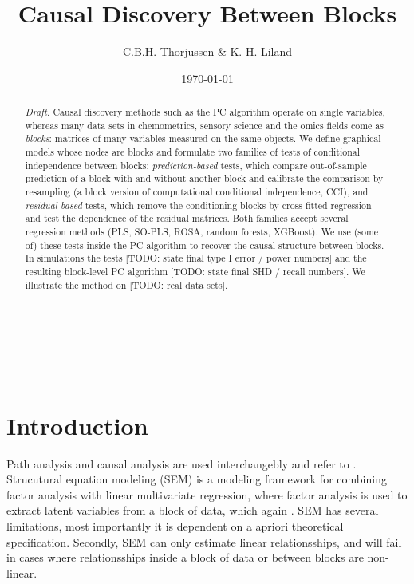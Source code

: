 \documentclass[10pt,leqno]{amsart}
\newcommand{\todo}[1]{{\color{red}[TODO: #1]}}
\begin{document}
\title{Causal Discovery Between Blocks} %
\author[Initial Surname]{C.B.H. Thorjussen \& K. H. Liland}
\date{\today}
\address{Telemarksforsking}
\maketitle

\let\thefootnote\relax
{} %

\begin{abstract}
\emph{Draft.} Causal discovery methods such as the PC algorithm operate on single
variables, whereas many data sets in chemometrics, sensory science and the
omics fields come as \emph{blocks}: matrices of many variables measured on the
same objects. We define graphical models whose nodes are blocks and formulate two
families of tests of conditional independence between blocks: \emph{prediction-based}
tests, which compare out-of-sample prediction of a block with and without another
block and calibrate the comparison by resampling (a block version of computational
conditional independence, CCI), and \emph{residual-based} tests, which remove the
conditioning blocks by cross-fitted regression and test the dependence of the
residual matrices. Both families accept several regression methods (PLS, SO-PLS,
ROSA, random forests, XGBoost). We use (some of) these tests inside the PC
algorithm to recover the causal structure between blocks. In simulations the tests
\todo{state final type I error / power numbers} and the resulting block-level PC
algorithm \todo{state final SHD / recall numbers}. We illustrate the method on
\todo{real data sets}.
\end{abstract} %

\bigskip

\noindent

$\,$

$\,$
\section{Introduction}
Path analysis and causal analysis are used interchangebly and refer to . Strucutural equation modeling (SEM) is a modeling framework for combining factor analysis with linear multivariate regression, where factor analysis is used to extract latent variables from a block of data, which again . SEM has several limitations, most importantly it is dependent on a apriori theoretical specification. Secondly, SEM can only estimate linear relationsships, and will fail in cases where relationsships inside a block of data or between blocks are non-linear.    
\end{document}
